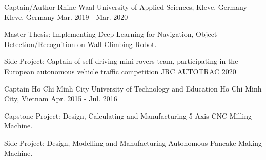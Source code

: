 \begin{cventries}

  \cventry
    {Captain/Author} %
    {Rhine-Waal University of Applied Sciences, Kleve, Germany} %
    {Kleve, Germany} %
    {Mar. 2019 - Mar. 2020} %
    {
      \begin{cvitems} %
        \item {Master Thesis:  Implementing Deep Learning for Navigation, Object Detection/Recognition on Wall-Climbing Robot.}
        \item {Side Project: Captain of self-driving mini rovers team, participating in the European autonomous vehicle traffic competition JRC AUTOTRAC 2020}
      \end{cvitems}
    }

  \cventry
    {Captain} %
    {Ho Chi Minh City University of Technology and Education} %
    {Ho Chi Minh City, Vietnam} %
    {Apr. 2015 - Jul. 2016} %
    {
      \begin{cvitems} %
        \item {Capstone Project: Design, Calculating and Manufacturing 5 Axis CNC Milling Machine.}
        \item {Side Project: Design, Modelling and Manufacturing Autonomous Pancake Making Machine.}
      \end{cvitems}
    }


\end{cventries}
